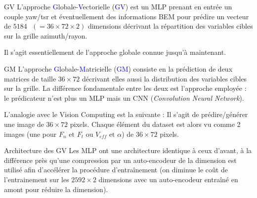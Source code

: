 \documentclass[
11pt,notheorems,hyperref={pdfauthor=whatever}
]{beamer}
\begin{document}
\begin{frame}{GV}
    L'approche \textcolor{blue}{G}lobale-\textcolor{blue}{V}ectorielle (\textcolor{blue}{GV}) est un MLP prenant en 
    entrée un couple yaw/tsr et éventuellement des informations BEM pour prédire un  vecteur de $5184 \text{ }(= 36 \times 72 \times 2)$ dimensions
    décrivant la répartition des variables cibles sur la grille azimuth/rayon. 

    \vspace{0.3cm}

    Il s'agit essentiellement de l'approche globale connue jusqu'à maintenant.
\end{frame}

\begin{frame}{GM}
    L'approche \textcolor{blue}{G}lobale-\textcolor{blue}{M}atricielle (\textcolor{blue}{GM}) consiste en la prédiction de deux matrices de taille
    $36 \times 72$ décrivant elles aussi la distribution des variables cibles sur la grille. La différence fondamentale entre les
    deux est l'approche employée : le prédicateur n'est plus un MLP mais un CNN (\textit{Convolution Neural Network}).

    \vspace{0.3cm}

    L'analogie avec le Vision Computing est la suivante : Il s'agit de prédire/générer une image de $36 \times 72$ pixels. 
    Chaque élément du dataset est alors vu comme 2 images (une pour $F_n \text{ et } F_t$ ou $V_{eff} \text{ et } \alpha$) de $36 \times 72$ pixels. 

\end{frame}

\begin{frame}{Architecture des GV}
    Les MLP ont une architecture identique à ceux d'avant, à la différence près qu'une compression
    par un auto-encodeur de la dimension est utilisé afin d'accélérer la procédure d'entraînement 
    (on diminue le coût de l'entrainement sur les $2592 \times 2$ dimensions avec un auto-encodeur
    entraîné en amont pour réduire la dimension).
\end{frame}
\end{document}
